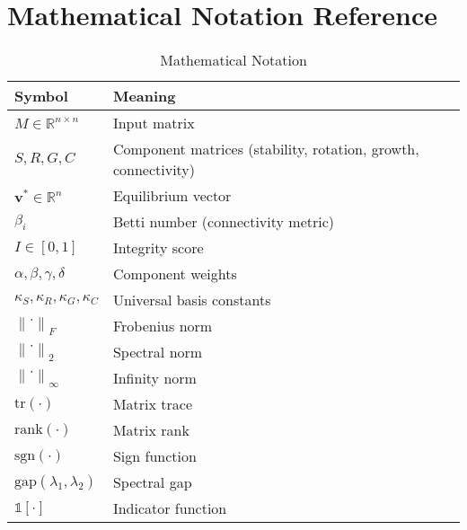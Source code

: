 \documentclass[11pt,a4paper]{article}
\theoremstyle{definition}
\theoremstyle{remark}
\newcommand{\R}{\mathbb{R}}
\newcommand{\norm}[1]{\left\|#1\right\|}
\newcommand{\trace}{\text{tr}}
\newcommand{\rank}{\text{rank}}
\newcommand{\sgn}{\text{sgn}}
\newcommand{\gap}{\text{gap}}
\begin{document}
\section{Mathematical Notation Reference}

\begin{table}[h]
\centering
\begin{tabular}{ll}
\toprule
\textbf{Symbol} & \textbf{Meaning} \\
\midrule
$M \in \R^{n \times n}$ & Input matrix \\
$S, R, G, C$ & Component matrices (stability, rotation, growth, connectivity) \\
$\mathbf{v}^* \in \R^n$ & Equilibrium vector \\
$\beta_i$ & Betti number (connectivity metric) \\
$I \in [0,1]$ & Integrity score \\
$\alpha, \beta, \gamma, \delta$ & Component weights \\
$\kappa_S, \kappa_R, \kappa_G, \kappa_C$ & Universal basis constants \\
$\norm{\cdot}_F$ & Frobenius norm \\
$\norm{\cdot}_2$ & Spectral norm \\
$\norm{\cdot}_\infty$ & Infinity norm \\
$\trace(\cdot)$ & Matrix trace \\
$\rank(\cdot)$ & Matrix rank \\
$\sgn(\cdot)$ & Sign function \\
$\gap(\lambda_1, \lambda_2)$ & Spectral gap \\
$\mathbb{1}[\cdot]$ & Indicator function \\
\bottomrule
\end{tabular}
\caption{Mathematical Notation}
\label{tab:notation}
\end{table}
\end{document}
